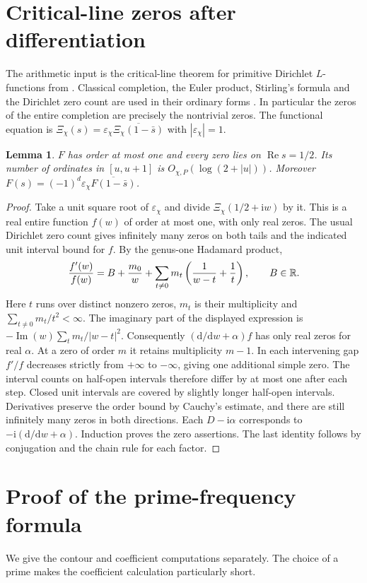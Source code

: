 \documentclass[11pt,letterpaper]{article}
\newtheorem{lemma}[theorem]{Lemma}
\newcommand{\rpart}{\operatorname{Re}}\newcommand{\ipart}{\operatorname{Im}}
\newcommand{\dd}{\mathrm d}\newcommand{\ii}{\mathrm i}
\begin{document}
\section{Critical-line zeros after differentiation}\label{sec:line}
The arithmetic input is the critical-line theorem for primitive Dirichlet
$L$-functions from \cite{lean}. Classical completion, the Euler product,
Stirling's formula and the Dirichlet zero count are used in their ordinary
forms \cite{dav,bmor}. In particular the zeros of the entire completion
are precisely the nontrivial zeros. The functional equation is
$\Xi_\chi(s)=\varepsilon_\chi\overline{\Xi_\chi(1-\bar s)}$ with
$|\varepsilon_\chi|=1$.
\begin{lemma}\label{interlace}
$F$ has order at most one and every zero lies on $\rpart s=1/2$.
Its number of ordinates in $[u,u+1]$ is $O_{\chi,P}(\log(2+|u|))$.
Moreover $F(s)=(-1)^d\varepsilon_\chi\overline{F(1-\bar s)}$.
\end{lemma}
\begin{proof}
Take a unit square root of $\varepsilon_\chi$ and divide
$\Xi_\chi(1/2+\ii w)$ by it. This is a real entire function $f(w)$
of order at most one, with only real zeros. The usual Dirichlet zero
count gives infinitely many zeros on both tails and the indicated unit
interval bound for $f$. By the genus-one Hadamard product,
\[
 \frac{f'(w)}{f(w)}
   =B+\frac{m_0}{w}
     +\sum_{t\ne0}m_t\left(\frac1{w-t}+\frac1t\right),
 \qquad B\in\mathbb R .
\]
Here $t$ runs over distinct nonzero zeros, $m_t$ is their multiplicity and
$\sum_{t\ne0}m_t/t^2<\infty$. The imaginary part of the displayed
expression is $-\ipart(w)\sum_t m_t/|w-t|^2$. Consequently
$(\dd/\dd w+\alpha)f$ has only real zeros for real $\alpha$. At a zero
of order $m$ it retains multiplicity $m-1$. In each intervening gap
$f'/f$ decreases strictly from $+\infty$ to $-\infty$, giving one
additional simple zero. The interval counts on half-open intervals
therefore differ by at most one after each step. Closed unit intervals
are covered by slightly longer half-open intervals. Derivatives preserve
the order bound by Cauchy's estimate, and there are still infinitely
many zeros in both directions. Each $D-\ii\alpha$ corresponds to
$-\ii(\dd/\dd w+\alpha)$. Induction proves the zero assertions. The
last identity follows by conjugation and the chain rule for each factor.
\end{proof}

\section{Proof of the prime-frequency formula}
We give the contour and coefficient computations separately. The choice
of a prime makes the coefficient calculation particularly short.
\end{document}
